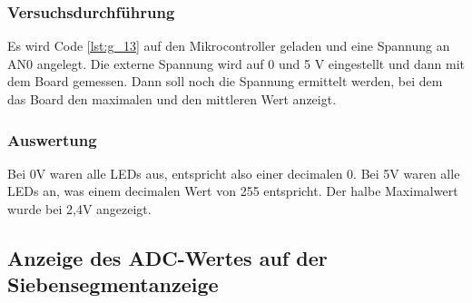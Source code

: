 \documentclass[12pt,a4paper]{article}
\begin{document}
\subsubsection*{Versuchsdurchführung}

Es wird Code \ref{lst:g_13} auf den Mikrocontroller geladen und eine Spannung an AN0 angelegt. Die externe Spannung wird auf 0 und 5 V eingestellt und dann mit dem Board gemessen. Dann soll noch die Spannung ermittelt werden, bei dem das  Board den maximalen und den mittleren Wert anzeigt.


\subsubsection*{Auswertung}

Bei 0V waren alle LEDs aus, entspricht also einer decimalen 0. Bei 5V waren alle LEDs an, was einem decimalen Wert von 255 entspricht. Der halbe Maximalwert wurde bei 2,4V angezeigt.

\subsection{Anzeige des ADC-Wertes auf der Siebensegmentanzeige}
\end{document}
